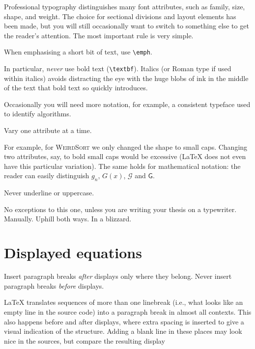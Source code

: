 Professional typography distinguishes many font attributes, such as
family, size, shape, and weight.  The choice for sectional divisions
and layout elements has been made, but you will still occasionally
want to switch to something else to get the reader's attention.  The
most important rule is very simple.

\begin{Rule}
  When emphasising a short bit of text, use \lstinline-\emph-.
\end{Rule}

In particular, \emph{never} use bold text (\lstinline-\textbf-).
Italics (or Roman type if used within italics) avoids distracting the
eye with the huge blobs of ink in the middle of the text that bold
text so quickly introduces.

Occasionally you will need more notation, for example, a consistent
typeface used to identify algorithms.

\begin{Rule}
  Vary one attribute at a time.
\end{Rule}

For example, for \textsc{WeirdSort} we only changed the shape to small
caps.  Changing two attributes, say, to bold small caps would be
excessive (\LaTeX{} does not even have this particular variation).
The same holds for mathematical notation: the reader can easily
distinguish \(g_n\), \(G(x)\), \(\mathcal{G}\) and \(\mathsf{G}\).

\begin{Rule}
  Never underline or uppercase.
\end{Rule}

No exceptions to this one, unless you are writing your thesis on a
typewriter.  Manually.  Uphill both ways.  In a blizzard.


\section*{Displayed equations}

\begin{Rule}
  Insert paragraph breaks \emph{after} displays only where they
  belong.  Never insert paragraph breaks \emph{before} displays.
\end{Rule}

\LaTeX{} translates sequences of more than one linebreak (i.e., what
looks like an empty line in the source code) into a paragraph break in
almost all contexts.  This also happens before and after displays,
where extra spacing is inserted to give a visual indication of the
structure.  Adding a blank line in these places may look nice in the
sources, but compare the resulting display

